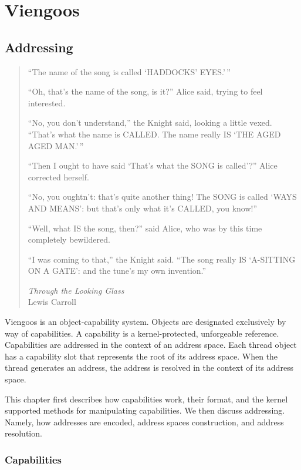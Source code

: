 \part{Viengoos}

\chapter{Addressing}

\begin{quotation}
  ``The name of the song is called `HADDOCKS' EYES.'\,''

  ``Oh, that's the name of the song, is it?'' Alice said, trying to feel
  interested.

  ``No, you don't understand,'' the Knight said, looking a little vexed.
  ``That's what the name is CALLED.  The name really IS `THE AGED AGED
  MAN.'\,''

  ``Then I ought to have said `That's what the SONG is called'?''
  Alice corrected herself.

  ``No, you oughtn't: that's quite another thing!  The SONG is called
  `WAYS AND MEANS': but that's only what it's CALLED, you know!''

  ``Well, what IS the song, then?'' said Alice, who was by this
  time completely bewildered.

  ``I was coming to that,'' the Knight said.  ``The song really IS
  `A-SITTING ON A GATE':  and the tune's my own invention.''

  \begin{flushright}
    \emph{Through the Looking Glass}\\
    Lewis Carroll
  \end{flushright}
\end{quotation}


Viengoos is an object-capability system.  Objects are designated
exclusively by way of capabilities.  A capability is a
kernel-protected, unforgeable reference.  Capabilities are addressed
in the context of an address space.  Each thread object has a
capability slot that represents the root of its address space.  When
the thread generates an address, the address is resolved in the
context of its address space.

This chapter first describes how capabilities work, their format, and
the kernel supported methods for manipulating capabilities.  We then
discuss addressing.  Namely, how addresses are encoded, address spaces
construction, and address resolution.

\section{Capabilities}

